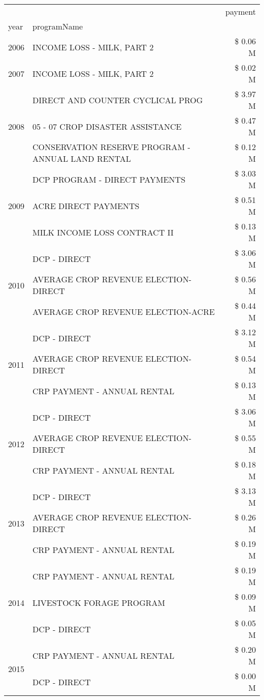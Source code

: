 \begin{tabular}{llr}
\toprule
 &  & payment \\
year & programName &  \\
\midrule
2006 & INCOME LOSS - MILK, PART 2 & \$ 0.06 M \\
\cline{1-3}
2007 & INCOME LOSS - MILK, PART 2 & \$ 0.02 M \\
\cline{1-3}
\multirow[t]{3}{*}{2008} & DIRECT AND COUNTER CYCLICAL PROG & \$ 3.97 M \\
 & 05 - 07 CROP DISASTER ASSISTANCE & \$ 0.47 M \\
 & CONSERVATION RESERVE PROGRAM - ANNUAL LAND RENTAL & \$ 0.12 M \\
\cline{1-3}
\multirow[t]{3}{*}{2009} & DCP PROGRAM - DIRECT PAYMENTS & \$ 3.03 M \\
 & ACRE DIRECT PAYMENTS & \$ 0.51 M \\
 & MILK INCOME LOSS CONTRACT II & \$ 0.13 M \\
\cline{1-3}
\multirow[t]{3}{*}{2010} & DCP - DIRECT & \$ 3.06 M \\
 & AVERAGE CROP REVENUE ELECTION-DIRECT & \$ 0.56 M \\
 & AVERAGE CROP REVENUE ELECTION-ACRE & \$ 0.44 M \\
\cline{1-3}
\multirow[t]{3}{*}{2011} & DCP - DIRECT & \$ 3.12 M \\
 & AVERAGE CROP REVENUE ELECTION-DIRECT & \$ 0.54 M \\
 & CRP PAYMENT - ANNUAL RENTAL & \$ 0.13 M \\
\cline{1-3}
\multirow[t]{3}{*}{2012} & DCP - DIRECT & \$ 3.06 M \\
 & AVERAGE CROP REVENUE ELECTION-DIRECT & \$ 0.55 M \\
 & CRP PAYMENT - ANNUAL RENTAL & \$ 0.18 M \\
\cline{1-3}
\multirow[t]{3}{*}{2013} & DCP - DIRECT & \$ 3.13 M \\
 & AVERAGE CROP REVENUE ELECTION-DIRECT & \$ 0.26 M \\
 & CRP PAYMENT - ANNUAL RENTAL & \$ 0.19 M \\
\cline{1-3}
\multirow[t]{3}{*}{2014} & CRP PAYMENT - ANNUAL RENTAL & \$ 0.19 M \\
 & LIVESTOCK FORAGE PROGRAM & \$ 0.09 M \\
 & DCP - DIRECT & \$ 0.05 M \\
\cline{1-3}
\multirow[t]{3}{*}{2015} & CRP PAYMENT - ANNUAL RENTAL & \$ 0.20 M \\
 & DCP - DIRECT & \$ 0.00 M \\

\end{tabular}
